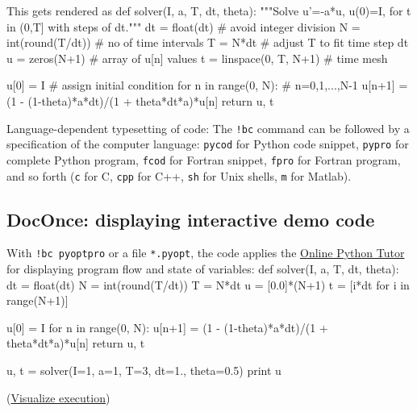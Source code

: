 \documentclass[%
oneside,                 %
final,                   %
10pt]{article}
\begin{document}
\eccq

This gets rendered as
\bpycod
def solver(I, a, T, dt, theta):
    """Solve u'=-a*u, u(0)=I, for t in (0,T] with steps of dt."""
    dt = float(dt)           # avoid integer division
    N = int(round(T/dt))     # no of time intervals
    T = N*dt                 # adjust T to fit time step dt
    u = zeros(N+1)           # array of u[n] values
    t = linspace(0, T, N+1)  # time mesh

    u[0] = I                 # assign initial condition
    for n in range(0, N):    # n=0,1,...,N-1
        u[n+1] = (1 - (1-theta)*a*dt)/(1 + theta*dt*a)*u[n]
    return u, t

\epycod

\begin{block}{Language-dependent typesetting of code: }
The \Verb?!bc? command can be followed by a specification of the computer
language: \texttt{pycod} for Python code snippet, \texttt{pypro} for complete Python
program, \texttt{fcod} for Fortran snippet, \texttt{fpro} for Fortran program, and so
forth (\texttt{c} for C, \texttt{cpp} for C++, \texttt{sh} for Unix shells, \texttt{m} for Matlab).
\end{block}
\subsection{DocOnce: displaying interactive demo code}
\label{slide:pot}
With \Verb?!bc pyoptpro? or a file \texttt{*.pyopt}, the code applies the
\href{{https://pythontutor.com}}{Online Python Tutor} for displaying
program flow and state of variables:
\bpypro
def solver(I, a, T, dt, theta):
    dt = float(dt)
    N = int(round(T/dt))
    T = N*dt
    u = [0.0]*(N+1)
    t = [i*dt for i in range(N+1)]

    u[0] = I
    for n in range(0, N):
        u[n+1] = (1 - (1-theta)*a*dt)/(1 + theta*dt*a)*u[n]
    return u, t

u, t = solver(I=1, a=1, T=3, dt=1., theta=0.5)
print u

\epypro

\noindent
(\href{{https://pythontutor.com/visualize.html\#code=def+solver\%28I\%2C+a\%2C+T\%2C+dt\%2C+theta\%29\%3A\%0A++++dt+\%3D+float\%28dt\%29\%0A++++N+\%3D+int\%28round\%28T\%2Fdt\%29\%29\%0A++++T+\%3D+N\%2Adt\%0A++++u+\%3D+\%5B0.0\%5D\%2A\%28N\%2B1\%29\%0A++++t+\%3D+\%5Bi\%2Adt+for+i+in+range\%28N\%2B1\%29\%5D\%0A\%0A++++u\%5B0\%5D+\%3D+I\%0A++++for+n+in+range\%280\%2C+N\%29\%3A\%0A++++++++u\%5Bn\%2B1\%5D+\%3D+\%281+-+\%281-theta\%29\%2Aa\%2Adt\%29\%2F\%281+\%2B+theta\%2Adt\%2Aa\%29\%2Au\%5Bn\%5D\%0A++++return+u\%2C+t\%0A\%0Au\%2C+t+\%3D+solver\%28I\%3D1\%2C+a\%3D1\%2C+T\%3D3\%2C+dt\%3D1.\%2C+theta\%3D0.5\%29\%0Aprint+u&mode=display&cumulative=false&heapPrimitives=false&drawParentPointers=false&textReferences=false&py=2&curInstr=0}}{Visualize execution}) 
\end{document}
